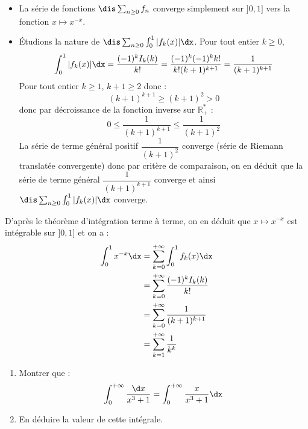 \documentclass[a4paper,10pt]{report}
\begin{document}
\begin{enumerate}
\begin{itemize}
\item La série de fonctions $\dis \sum_{n \geq 0} f_n$ converge simplement sur $]0,1]$ vers la fonction $x \mapsto x^{-x}$.
\item Étudions la nature de $\dis \sum_{n \geq 0} \int_0^1 \vert f_k(x) \vert\dx$. Pour tout entier $k \geq 0$,
$$ \int_0^1 \vert f_k(x) \vert\dx = \dfrac{(-1)^k I_k(k)}{k!} = \dfrac{(-1)^k(-1)^k k!}{k! (k+1)^{k+1}} = \dfrac{1}{(k+1)^{k+1}}$$
Pour tout entier $k \geq 1$, $k+1 \geq 2$ donc : 
$$ (k+1)^{k+1} \geq (k+1)^2 >0$$
donc par décroissance de la fonction inverse sur $\mathbb{R}_+^{*}$ :
$$ 0 \leq \dfrac{1}{(k+1)^{k+1}} \leq \dfrac{1}{(k+1)^2}$$
La série de terme général positif $\dfrac{1}{(k+1)^2}$ converge (série de Riemann translatée convergente) donc par critère de comparaison, on en déduit que la série de terme général $\dfrac{1}{(k+1)^{k+1}}$ converge et ainsi $\dis \sum_{n \geq 0} \int_0^1 \vert f_k(x) \vert\dx$ converge.
\end{itemize}
D'après le théorème d'intégration terme à terme, on en déduit que $x \mapsto x^{-x}$ est intégrable sur $]0,1]$ et on a :
\begin{align*}
\int_0^1 x^{-x} \dx & = \sum_{k=0}^{+ \infty} \int_0^1 f_k(x) \dx \\
& = \sum_{k=0}^{+ \infty} \dfrac{(-1)^k I_k(k)}{k!} \\
& = \sum_{k=0}^{+ \infty} \dfrac{1}{(k+1)^{k+1}} \\
& = \sum_{k=1}^{+ \infty} \dfrac{1}{k^k}
\end{align*}
\end{enumerate}

\begin{Exercice}{}
\begin{enumerate}
  \item
    Montrer que :
    \[
\int_{0}^{ + \infty} \frac{\d x}{x^{3} + 1} = \int_{0}^{ + \infty} \frac{x}{x^{3} + 1}\dx
    \]
  \item
    En déduire la valeur de cette intégrale.
  \end{enumerate}
\end{Exercice} 

\corr 
\end{document}
